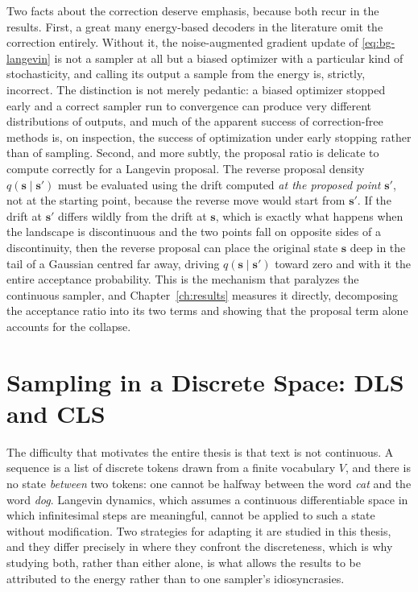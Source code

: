 Two facts about the correction deserve emphasis, because both recur in the results. First, a great many energy-based decoders in the literature omit the correction entirely. Without it, the noise-augmented gradient update of \eqref{eq:bg-langevin} is not a sampler at all but a biased optimizer with a particular kind of stochasticity, and calling its output a sample from the energy is, strictly, incorrect. The distinction is not merely pedantic: a biased optimizer stopped early and a correct sampler run to convergence can produce very different distributions of outputs, and much of the apparent success of correction-free methods is, on inspection, the success of optimization under early stopping rather than of sampling. Second, and more subtly, the proposal ratio is delicate to compute correctly for a Langevin proposal. The reverse proposal density $q(\bm{s} \mid \bm{s}')$ must be evaluated using the drift computed \emph{at the proposed point} $\bm{s}'$, not at the starting point, because the reverse move would start from $\bm{s}'$. If the drift at $\bm{s}'$ differs wildly from the drift at $\bm{s}$, which is exactly what happens when the landscape is discontinuous and the two points fall on opposite sides of a discontinuity, then the reverse proposal can place the original state $\bm{s}$ deep in the tail of a Gaussian centred far away, driving $q(\bm{s} \mid \bm{s}')$ toward zero and with it the entire acceptance probability. This is the mechanism that paralyzes the continuous sampler, and Chapter~\ref{ch:results} measures it directly, decomposing the acceptance ratio into its two terms and showing that the proposal term alone accounts for the collapse.

\section{Sampling in a Discrete Space: DLS and CLS}
\label{sec:bg-samplers}

The difficulty that motivates the entire thesis is that text is not continuous. A sequence is a list of discrete tokens drawn from a finite vocabulary $V$, and there is no state \emph{between} two tokens: one cannot be halfway between the word \emph{cat} and the word \emph{dog}. Langevin dynamics, which assumes a continuous differentiable space in which infinitesimal steps are meaningful, cannot be applied to such a state without modification. Two strategies for adapting it are studied in this thesis, and they differ precisely in where they confront the discreteness, which is why studying both, rather than either alone, is what allows the results to be attributed to the energy rather than to one sampler's idiosyncrasies.

